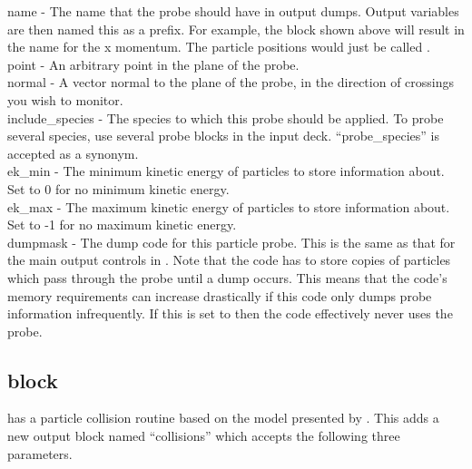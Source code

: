{\emphtext name} - The name that the probe should have in output dumps. Output
  variables are then named this as a prefix. For example, the block shown above
  will result in the name  for
  the x momentum. The particle positions would just be called
  .\\

{\emphtext point} - An arbitrary point in the plane of the probe.\\

{\emphtext normal} - A vector normal to the plane of the probe, in the direction
  of crossings you wish to monitor.\\

{\emphtext include\_species} - The species to which this probe should be
  applied. To probe several species, use several probe blocks in the input
  deck. ``probe\_species'' is accepted as a synonym.\\

{\emphtext ek\_min} - The minimum kinetic energy of particles to store
  information about. Set to 0 for no minimum kinetic energy.\\

{\emphtext ek\_max} - The maximum kinetic energy of particles to store
  information about. Set to -1 for no maximum kinetic energy.\\

{\emphtext dumpmask} - The dump code for this particle probe. This is the same
  as that for the main output controls in . Note that
  the code has to store copies of particles which pass through the probe until
  a dump occurs. This means that the code's memory requirements can increase
  drastically if this code only dumps probe information infrequently. If this
  is set to  then the code effectively never uses the probe.\\


\subsection{ block}
\label{sec:collisions_block}
{\EPOCH} has a particle collision routine based on the model presented
by \citet{Sentoku}.
This adds a new output block named ``collisions'' which accepts the
following three parameters.\\


